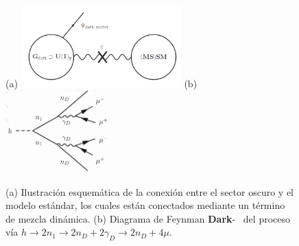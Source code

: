 \begin{figure}[!t]
    \centering
    (a)
    \includegraphics[width=0.55\textwidth]{Cap1/imagenes/sketch_darksector.png}
    (b)
    \includegraphics[width=0.35\textwidth]{Cap1/imagenes/darksusy_feynman.png}
    \caption{(a) Ilustración esquemática de la conexión entre el sector oscuro y el modelo estándar, los cuales están conectados mediante un término de mezcla dinámica. (b) Diagrama de Feynman \textbf{Dark}-\SUSY ~ del proceso vía $h \rightarrow 2n_1 \rightarrow 2n_D + 2\gamma_D \rightarrow 2n_D + 4\mu$.}
    \label{fig:sketch_darksector}
\end{figure}

